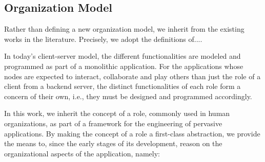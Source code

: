 \subsection{Organization Model}

Rather than defining a new organization model, we inherit from the existing works in the literature. Precisely, we adopt the definitions of.... %


In today's client-server model, the different functionalities are modeled and programmed as part of a monolithic application. For the applications whose nodes are expected to interact, collaborate and play others than just the role of a client from a backend server, the distinct functionalities of each role form a concern of their own, i.e., they must be designed and programmed accordingly. 

In this work, we inherit the concept of a role, commonly used in human organizations, as part of a framework for the engineering of pervasive applications. By making the concept of a role a first-class abstraction, we provide the means to, since the early stages of its development, reason on the organizational aspects of the application, namely:

